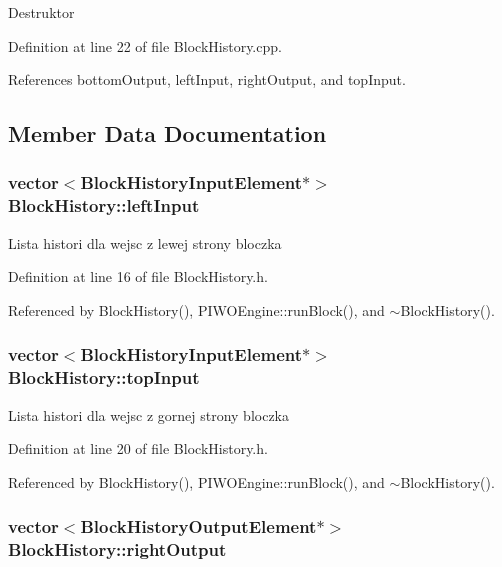 Destruktor 

Definition at line 22 of file BlockHistory.cpp.

References bottomOutput, leftInput, rightOutput, and topInput.

\subsection{Member Data Documentation}
\hypertarget{classBlockHistory_aabd8ceb5c5cf94ca36778ad9a703c79}{
\subsubsection[leftInput]{\setlength{\rightskip}{0pt plus 5cm}vector$<${\bf BlockHistoryInputElement}$\ast$$>$ {\bf BlockHistory::leftInput}}}
\label{classBlockHistory_aabd8ceb5c5cf94ca36778ad9a703c79}


Lista histori dla wejsc z lewej strony bloczka 

Definition at line 16 of file BlockHistory.h.

Referenced by BlockHistory(), PIWOEngine::runBlock(), and $\sim$BlockHistory().\hypertarget{classBlockHistory_206bee2db6d12c0d406d90d3dc4b54ac}{
\subsubsection[topInput]{\setlength{\rightskip}{0pt plus 5cm}vector$<${\bf BlockHistoryInputElement}$\ast$$>$ {\bf BlockHistory::topInput}}}
\label{classBlockHistory_206bee2db6d12c0d406d90d3dc4b54ac}


Lista histori dla wejsc z gornej strony bloczka 

Definition at line 20 of file BlockHistory.h.

Referenced by BlockHistory(), PIWOEngine::runBlock(), and $\sim$BlockHistory().\hypertarget{classBlockHistory_e7d44768a04aeb3d73444ec684486f08}{
\subsubsection[rightOutput]{\setlength{\rightskip}{0pt plus 5cm}vector$<${\bf BlockHistoryOutputElement}$\ast$$>$ {\bf BlockHistory::rightOutput}}}
\label{classBlockHistory_e7d44768a04aeb3d73444ec684486f08}


